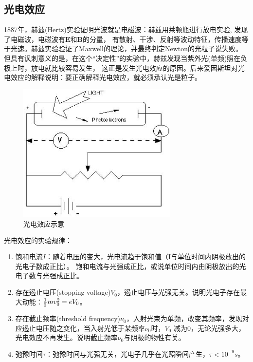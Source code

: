\subsection{光电效应}


1887年，赫兹(Hertz)实验证明光波就是电磁波：赫兹用莱顿瓶进行放电实验,
发现了电磁波，电磁波有$\textbf{E}$和$\textbf{B}$的分量，
有散射、干涉、反射等波动特征，传播速度等于光速。赫兹实验验证了Maxwell的理论，并最终判定Newton的光粒子说失败。
但具有讽刺意义的是，在这个``决定性''的实验中，赫兹发现当紫外光(单频)照在负极上时，放电就比较容易发生，
这正是发生光电效应的原因。后来爱因斯坦对光电效应的解释说明：要正确解释光电效应，就必须承认光是粒子。

\begin{figure}[h]
\begin{center}
\includegraphics[width=8cm]{Duality/3-1.ps}
\caption{光电效应示意}
\end{center}
\end{figure}

光电效应的实验规律：


\begin{enumerate}
    \item 饱和电流$I$：随着电压的变大，光电流趋于饱和值（I与单位时间内阴极放出的光电子数成正比）。
饱和电流与光强成正比，或说单位时间内由阴极放出的光电子数与光强成正比。
    \item 存在遏止电压(stopping voltage)$V_0$，遏止电压与光强无关。说明光电子存在最大动能：${\textstyle{1 \over 2}}mv_0 ^2  = eV_0 $。
    \item 存在截止频率(threshold frequency)$\nu _0$，入射光束为单频，改变其频率，发现对应遏止电压随之变化，当入射光低于某频率$\nu _0$时，$V_0$ 减为0，无论光强多大，光电效应不再发生。说明截止频率$\nu _0$与阴极的物性有关。
    \item 弛豫时间$\tau$：弛豫时间与光强无关，光电子几乎在光照瞬间产生，$\tau  < 10^{ - 9} s$。
\end{enumerate}

